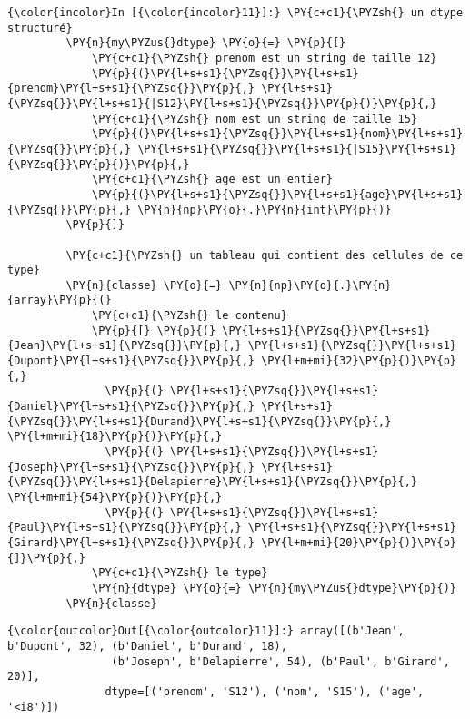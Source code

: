     \begin{Verbatim}[commandchars=\\\{\},frame=single,framerule=0.3mm,rulecolor=\color{cellframecolor}]
{\color{incolor}In [{\color{incolor}11}]:} \PY{c+c1}{\PYZsh{} un dtype structuré}
         \PY{n}{my\PYZus{}dtype} \PY{o}{=} \PY{p}{[}
             \PY{c+c1}{\PYZsh{} prenom est un string de taille 12}
             \PY{p}{(}\PY{l+s+s1}{\PYZsq{}}\PY{l+s+s1}{prenom}\PY{l+s+s1}{\PYZsq{}}\PY{p}{,} \PY{l+s+s1}{\PYZsq{}}\PY{l+s+s1}{|S12}\PY{l+s+s1}{\PYZsq{}}\PY{p}{)}\PY{p}{,}
             \PY{c+c1}{\PYZsh{} nom est un string de taille 15}
             \PY{p}{(}\PY{l+s+s1}{\PYZsq{}}\PY{l+s+s1}{nom}\PY{l+s+s1}{\PYZsq{}}\PY{p}{,} \PY{l+s+s1}{\PYZsq{}}\PY{l+s+s1}{|S15}\PY{l+s+s1}{\PYZsq{}}\PY{p}{)}\PY{p}{,}
             \PY{c+c1}{\PYZsh{} age est un entier}
             \PY{p}{(}\PY{l+s+s1}{\PYZsq{}}\PY{l+s+s1}{age}\PY{l+s+s1}{\PYZsq{}}\PY{p}{,} \PY{n}{np}\PY{o}{.}\PY{n}{int}\PY{p}{)}
         \PY{p}{]}
         
         \PY{c+c1}{\PYZsh{} un tableau qui contient des cellules de ce type}
         \PY{n}{classe} \PY{o}{=} \PY{n}{np}\PY{o}{.}\PY{n}{array}\PY{p}{(}
             \PY{c+c1}{\PYZsh{} le contenu}
             \PY{p}{[} \PY{p}{(} \PY{l+s+s1}{\PYZsq{}}\PY{l+s+s1}{Jean}\PY{l+s+s1}{\PYZsq{}}\PY{p}{,} \PY{l+s+s1}{\PYZsq{}}\PY{l+s+s1}{Dupont}\PY{l+s+s1}{\PYZsq{}}\PY{p}{,} \PY{l+m+mi}{32}\PY{p}{)}\PY{p}{,}
               \PY{p}{(} \PY{l+s+s1}{\PYZsq{}}\PY{l+s+s1}{Daniel}\PY{l+s+s1}{\PYZsq{}}\PY{p}{,} \PY{l+s+s1}{\PYZsq{}}\PY{l+s+s1}{Durand}\PY{l+s+s1}{\PYZsq{}}\PY{p}{,} \PY{l+m+mi}{18}\PY{p}{)}\PY{p}{,}
               \PY{p}{(} \PY{l+s+s1}{\PYZsq{}}\PY{l+s+s1}{Joseph}\PY{l+s+s1}{\PYZsq{}}\PY{p}{,} \PY{l+s+s1}{\PYZsq{}}\PY{l+s+s1}{Delapierre}\PY{l+s+s1}{\PYZsq{}}\PY{p}{,} \PY{l+m+mi}{54}\PY{p}{)}\PY{p}{,}
               \PY{p}{(} \PY{l+s+s1}{\PYZsq{}}\PY{l+s+s1}{Paul}\PY{l+s+s1}{\PYZsq{}}\PY{p}{,} \PY{l+s+s1}{\PYZsq{}}\PY{l+s+s1}{Girard}\PY{l+s+s1}{\PYZsq{}}\PY{p}{,} \PY{l+m+mi}{20}\PY{p}{)}\PY{p}{]}\PY{p}{,}
             \PY{c+c1}{\PYZsh{} le type}
             \PY{n}{dtype} \PY{o}{=} \PY{n}{my\PYZus{}dtype}\PY{p}{)}
         \PY{n}{classe}
\end{Verbatim}


\begin{Verbatim}[commandchars=\\\{\},frame=single,framerule=0.3mm,rulecolor=\color{cellframecolor}]
{\color{outcolor}Out[{\color{outcolor}11}]:} array([(b'Jean', b'Dupont', 32), (b'Daniel', b'Durand', 18),
                (b'Joseph', b'Delapierre', 54), (b'Paul', b'Girard', 20)],
               dtype=[('prenom', 'S12'), ('nom', 'S15'), ('age', '<i8')])
\end{Verbatim}
            
